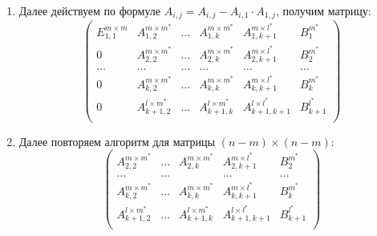 \documentclass[12pt]{report}
\begin{document}
\begin{enumerate}
            \item  \label{alg:form} Далее действуем по формуле $A_{i, j} = A_{i, j} - A_{i,1} \cdot A_{1,j}$, получим матрицу:
            \[
            \left(
            \begin{array}{ccccc|c}
                E_{1,1}^{m \times m} & A_{1,2}^{m \times m^*}   & \ldots & A_{1,k}^{m \times m^*}   & A_{1,k+1}^{m \times l^*}    & B^{m^*}_{1}   \\  
                0                    & A_{2,2}^{m \times m^*}   & \ldots & A_{2,k}^{m \times m^*}   & A_{2,k+1}^{m \times l^*}    & B^{m^*}_{2}   \\  
                \ldots               & \ldots                   & \ldots & \ldots                   & \ldots                      & \ldots        \\  
                0                    & A_{k,2}^{m \times m^*}   & \ldots & A_{k,k}^{m \times m^*}   & A_{k,k+1}^{m \times l^*}    & B^{m^*}_{k}   \\  
                0                    & A_{k+1,2}^{l \times m^*} & \ldots & A_{k+1,k}^{l \times m^*} & A_{k+1, k+1}^{l \times l^*} & B^{l^*}_{k+1} \\  
            \end{array}
            \right)
            \]

            \item \label{alg:repeat} Далее повторяем алгоритм для матрицы $(n - m) \times (n - m)$:
            \[
            \left(
            \begin{array}{cccc|c}
            A_{2,2}^{m \times m^*}     & \ldots & A_{2,k}^{m \times m^*}   & A_{2,k+1}^{m \times l^*}       & B^{m^*}_{2}   \\  
            \ldots                     & \ldots &                          & \ldots                         & \ldots        \\  
            A_{k,2}^{m \times m^*}     & \ldots & A_{k,k}^{m \times m^*}   & A_{k,k+1}^{m \times l^*}       & B^{m^*}_{k}   \\  
            A_{k+1,2}^{l \times m^*}   & \ldots & A_{k+1,k}^{l \times m^*} & A_{k+1, k+1}^{l \times l^*}    & B^{l^*}_{k+1} \\
            \end{array}
            \right)
            \]
        
        \end{enumerate}
            
\end{document}

